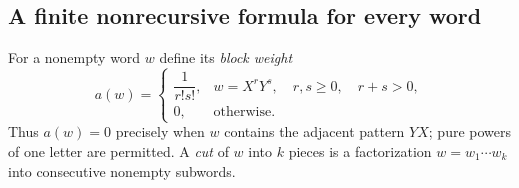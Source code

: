 \subsection{A finite nonrecursive formula for every word}
For a nonempty word $w$ define its \emph{block weight}
\begin{equation}\label{eq:weight}
 a(w)=
 \begin{cases}
 \dfrac1{r!s!},&w=X^rY^s,\quad r,s\geq0,\quad r+s>0,\\[6pt]
 0,&\text{otherwise}.
 \end{cases}
\end{equation}
Thus $a(w)=0$ precisely when $w$ contains the adjacent pattern $YX$; pure
powers of one letter are permitted. A \emph{cut} of $w$ into $k$ pieces is a
factorization $w=w_1\cdots w_k$ into consecutive nonempty subwords.


